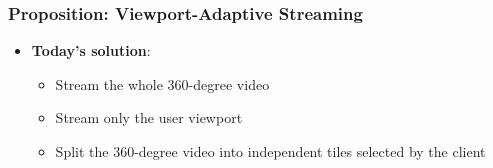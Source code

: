 \begin{frame}[c]
   \frametitle{Proposition: Viewport-Adaptive Streaming}

    {
   \begin{itemize}
      \item \textbf{Today's solution}:
      \begin{itemize}
         \item<only@2-5> Stream the whole 360-degree video
         \item<only@6-9> Stream only the user viewport
         \item<only@10-13> Split the 360-degree video into independent tiles selected by the client
      \end{itemize}
   \end{itemize}
   }
\end{frame}
